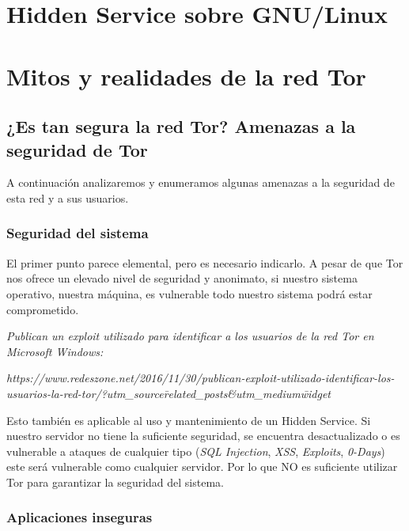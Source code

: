 \documentclass[a4paper, 11pt, titlepage]{article}
\begin{document}

\section{Hidden Service sobre GNU/Linux}


\section{Mitos y realidades de la red Tor}

    \subsection{¿Es tan segura la red Tor? Amenazas a la seguridad de Tor}

        A continuación analizaremos y enumeramos algunas amenazas a la seguridad de esta red y a sus usuarios.

    \subsubsection{Seguridad del sistema}

        El primer punto parece elemental, pero es necesario indicarlo. A pesar de que Tor nos ofrece un elevado 
        nivel de seguridad y anonimato, si nuestro sistema operativo, nuestra máquina, es vulnerable todo nuestro 
        sistema podrá estar comprometido.

        \begin{center}\emph{Publican un exploit utilizado para identificar a los usuarios de la red Tor en Microsoft Windows:}\end{center}
        \begin{center}\emph{https://www.redeszone.net/2016/11/30/publican-exploit-utilizado-identificar-los-usuarios-la-red-tor/?utm\_source\=related\_posts\&utm\_medium\=widget}\end{center}

        Esto también es aplicable al uso y mantenimiento de un Hidden Service. Si nuestro servidor no tiene la 
        suficiente seguridad, se encuentra desactualizado o es vulnerable a ataques de cualquier tipo (\emph{SQL Injection}, 
        \emph{XSS}, \emph{Exploits}, \emph{0-Days}) este será vulnerable como cualquier servidor. Por lo que NO es 
        suficiente utilizar Tor para garantizar la seguridad del sistema.

    \subsubsection{Aplicaciones inseguras}
\end{document}
